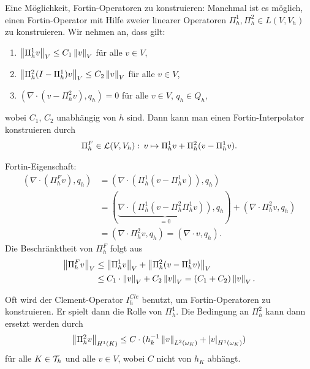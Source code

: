 \begin{bemerkung}\label{2-48}
  Eine Möglichkeit, Fortin-Operatoren zu konstruieren: Manchmal ist es möglich, einen Fortin-Operator mit Hilfe zweier linearer Operatoren $\Pi_{h}^{1}, \Pi_{h}^{2} \in L(V, V_{h})$ zu konstruieren. Wir nehmen an, dass gilt:
  \begin{enumerate}
  \item $\left \|\Pi_{h}^{1} v \right\|_{V} \leq C_{1} \left \|v \right\|_{V}$ für alle $v \in V$, 
  \item $\left \|\Pi_{h}^{2}(I-\Pi_{h}^{1}) v \right\|_{V} \leq C_{2} \left \|v \right\|_{V}$ für alle $v \in V$, 
  \item $(\nabla\cdot(v-\Pi_{h}^{2}v), q_{h}) = 0$ für alle $v \in V$, $q_{h} \in Q_{h}$, 
  \end{enumerate}
wobei $C_{1}$, $C_{2}$ unabhängig von $h$ sind. Dann kann man einen Fortin-Interpolator konstruieren durch
\begin{align*}
  \Pi_{h}^{F} \in {\cal L}(V, V_{h}): \, v \mapsto \Pi_{h}^{1} v + \Pi_{h}^{2}(v - \Pi_{h}^{1} v).
\end{align*}
\end{bemerkung}
\begin{beweis}
  Fortin-Eigenschaft:
  \begin{align*}
    (\nabla\cdot(\Pi_{h}^{F}v), q_{h}) &= (\nabla\cdot(\Pi_{h}^{1}(v - \Pi_{h}^{1}v)),q_{h})\\
&= (\underbrace{\nabla\cdot(\Pi_{h}^{1}(v - \Pi_{h}^{2}\Pi_{h}^{1}v))}_{= 0},q_{h}) + (\nabla\cdot \Pi_{h}^{2}v, q_{h})\\
&= (\nabla\cdot \Pi_{h}^{2}v, q_{h}) = (\nabla\cdot v, q_{h}). 
  \end{align*}
Die Beschränktheit von $\Pi_{h}^{F}$ folgt aus
\begin{align*}
  \left \|\Pi_{h}^{F}v \right\|_{V} &\leq \left \|\Pi_{h}^{1}v \right\|_{V} + \left \|\Pi_{h}^{2}(v - \Pi_{h}^{1} v) \right\|_{V} \\
 &\leq C_{1}\cdot \left \|v \right\|_{V} + C_{2}\left \|v \right\|_{V} = (C_{1} + C_{2})\left \|v \right\|_{V}.
\end{align*}
\end{beweis}
\begin{bemerkung}
  Oft wird der Clement-Operator $I_{h}^{Cle}$ benutzt, um Fortin-Operatoren zu konstruieren. Er spielt dann die Rolle von $\Pi_{h}^{1}$. Die Bedingung an $\Pi_{h}^{2}$ kann dann ersetzt werden durch 
  \begin{align*}
    \left \|\Pi_{h}^{2} v \right\|_{H^{1}(K)} \leq C \cdot (h_{k}^{-1} \left \|v \right\|_{L^{2}(\omega_{K})} + \left|v\right| _{H^{1}(\omega_{K})}) 
  \end{align*}
für alle $K \in {\cal T}_{h}$ und alle $v \in V$, wobei $C$ nicht von $h_{K}$ abhängt. 
\end{bemerkung}

